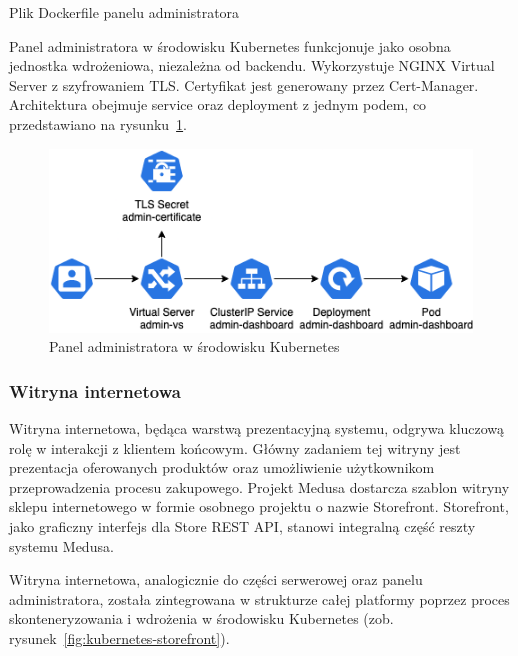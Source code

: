 \begin{listing}[H]
    \inputminted[xleftmargin=20pt,linenos]{docker}{code/Dockerfile.admin}
    \caption{Plik Dockerfile panelu administratora}
    \label{lst:medusajs-admin-dockerfile}
\end{listing}

Panel administratora w środowisku Kubernetes funkcjonuje jako osobna jednostka wdrożeniowa, niezależna od backendu.
Wykorzystuje NGINX Virtual Server z szyfrowaniem TLS. Certyfikat jest generowany przez Cert-Manager.
Architektura obejmuje service oraz deployment z jednym podem, co przedstawiano na rysunku~\ref{fig:kubernetes-admin}.

\begin{figure}[H]
    \centering
    \includegraphics[width=\textwidth]{img/kubernetes-admin-panel}
    \caption{Panel administratora w środowisku Kubernetes}
    \label{fig:kubernetes-admin}
\end{figure}

\subsubsection{Witryna internetowa}

Witryna internetowa, będąca warstwą prezentacyjną systemu, odgrywa kluczową rolę w interakcji z klientem końcowym.
Główny zadaniem tej witryny jest prezentacja oferowanych produktów oraz umożliwienie użytkownikom przeprowadzenia procesu zakupowego.
Projekt Medusa dostarcza szablon witryny sklepu internetowego w formie osobnego projektu o nazwie Storefront.
Storefront, jako graficzny interfejs dla Store REST API, stanowi integralną część reszty systemu Medusa.

Witryna internetowa, analogicznie do części serwerowej oraz panelu administratora, została zintegrowana w strukturze całej platformy poprzez proces skonteneryzowania i wdrożenia w środowisku Kubernetes (zob. rysunek~\ref{fig:kubernetes-storefront}).

